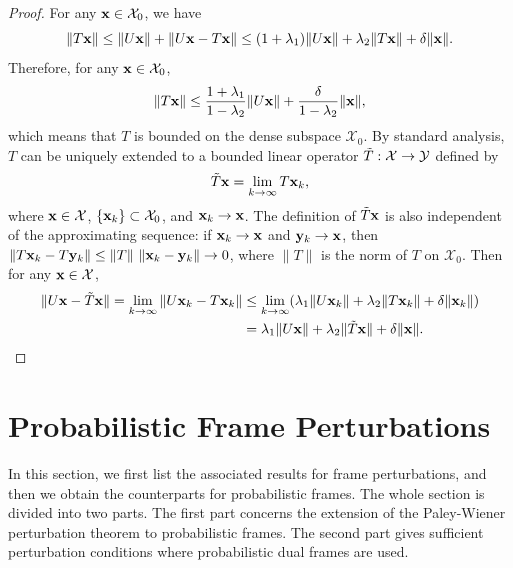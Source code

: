 \documentclass{amsart}
\numberwithin{equation}{section}
\theoremstyle{plain}
\theoremstyle{definition}
\begin{document}
\begin{proof}
    For any ${\bf x} \in \mathcal{X}_0$, we have
     \begin{equation*}
      \Vert T{\bf x} \Vert \leq  \Vert U{\bf x} \Vert +  \Vert U{\bf x} -T{\bf x} \Vert \leq (1+\lambda_1) \Vert U{\bf x} \Vert + \lambda_2 \Vert T{\bf x} \Vert + \delta \Vert {\bf x} \Vert.
    \end{equation*}
Therefore, for any ${\bf x} \in \mathcal{X}_0$, 
    \begin{equation*}
      \Vert T{\bf x} \Vert  \leq \frac{1+\lambda_1}{1-\lambda_2} \Vert U{\bf x} \Vert + \frac{\delta}{1-\lambda_2}  \Vert {\bf x} \Vert,
    \end{equation*}
which means that $T$ is bounded on the dense subspace $\mathcal{X}_0$. By standard analysis, $T$ can be uniquely extended to a bounded linear operator $\Tilde{T}: \mathcal{X} \rightarrow \mathcal{Y}$ defined by
$$\Tilde{T}{\bf x} = \lim\limits_{k \rightarrow \infty} T{\bf x}_k,$$
where ${\bf x} \in \mathcal{X}$, $\{{\bf x}_k\} \subset \mathcal{X}_0$, and ${\bf x}_k \rightarrow {\bf x}$. The definition of $\Tilde{T}{\bf x}$ is also independent of the approximating sequence: if ${\bf x}_k\to{\bf x}$ and ${\bf y}_k\to{\bf x}$, then $\|T{\bf x}_k-T{\bf y}_k\| \leq \|T\|\ \|{\bf x}_k-{\bf y}_k\|\to 0$, where $\|T\|$ is the norm of $T$ on $\mathcal{X}_0$.
Then for any ${\bf x} \in \mathcal{X}$, 
\begin{equation*}
\begin{split}
     \Vert U{\bf x} -\Tilde{T}{\bf x} \Vert= \lim_{k \rightarrow \infty} \| U{\bf x}_k -T{\bf x}_k \|
      &\leq  \lim_{k \rightarrow \infty} (\lambda_1 \Vert U{\bf x}_k \Vert + \lambda_2 \Vert T{\bf x}_k \Vert + \delta \Vert {\bf x}_k \Vert) \\
      & = \lambda_1 \Vert U{\bf x} \Vert + \lambda_2 \Vert \Tilde{T}{\bf x} \Vert + \delta \Vert {\bf x} \Vert.
\end{split}
    \end{equation*}
\end{proof}


\section{Probabilistic Frame Perturbations}\label{FramePerturbation}
In this section, we first list the associated results for frame perturbations, and then we obtain the counterparts for probabilistic frames. The whole section is divided into two parts. The first part concerns the extension of the Paley-Wiener perturbation theorem to probabilistic frames. The second part gives sufficient perturbation conditions where probabilistic dual frames are used.  
\end{document}
